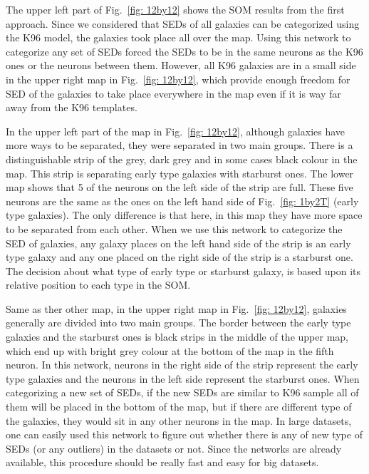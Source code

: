     The upper left part of Fig.~\ref{fig: 12by12} shows the SOM results from the first approach. 
    Since we considered that SEDs of all galaxies can be categorized using the K96 model, the galaxies took place all over the map.
    Using this network to categorize any set of SEDs forced the SEDs to be in the same neurons as the K96 ones or the neurons between them.
    However, all K96 galaxies are in a small side in the upper right map in Fig.~\ref{fig: 12by12}, which provide enough freedom for SED of the galaxies to take place everywhere in the map even if it is way far away from the K96 templates.
    
    
    In the upper left part of the map in Fig.~\ref{fig: 12by12}, although galaxies have more ways to be separated, they were separated in two main groups.
    There is a distinguishable strip of the grey, dark grey and in some cases black colour in the map.
    This strip is separating early type galaxies with starburst ones.
    The lower map shows that 5 of the neurons on the left side of the strip are full. 
    These five neurons are the same as the ones on the left hand side of Fig.~\ref{fig: 1by2T} (early type galaxies).
    The only difference is that here, in this map they have more space to be separated from each other.
    When we use this network to categorize the SED of galaxies, any galaxy places on the left hand side of the strip is an early type galaxy and any one placed on the right side of the strip is a starburst one.
    The decision about what type of early type or starburst galaxy, is based upon its relative position to each type in the SOM.
    
    Same as ther other map, in the upper right map in Fig.~\ref{fig: 12by12}, galaxies generally are divided into two main groups.
    The border between the early type galaxies and the starburst ones is black strips in the middle of the upper map, which end up with bright grey colour at the bottom of the map in the fifth neuron.
    In this network, neurons in the right side of the strip represent the early type galaxies and the neurons in the left side represent the starburst ones. 
    When categorizing a new set of SEDs, if the new SEDs are similar to K96 sample all of them will be placed in the bottom of the map, but if there are different type of the galaxies, they would sit in any other neurons in the map.
    In large datasets, one can easily used this network to figure out whether there is any of new type of SEDs (or any outliers) in the datasets or not. 
    Since the networks are already available, this procedure should be really fast and easy for big datasets.
    
